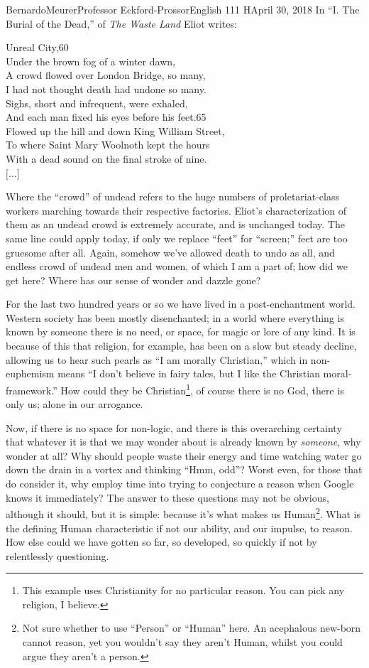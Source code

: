 \documentclass[12pt,letterpaper]{article}
\begin{document}
\begin{mla}{Bernardo}{Meurer}{Professor Eckford-Prossor}{English 111 H}{April 30, 2018}
	In ``I. The Burial of the Dead,'' of \textit{The Waste Land} Eliot writes:
	\begin{blocks}
		Unreal City,\hfill 60\\
		Under the brown fog of a winter dawn,\\
		A crowd flowed over London Bridge, so many,\\
		I had not thought death had undone so many.\\
		Sighs, short and infrequent, were exhaled,\\
		And each man fixed his eyes before his feet.\hfill 65\\
		Flowed up the hill and down King William Street,\\
		To where Saint Mary Woolnoth kept the hours\\
		With a dead sound on the final stroke of nine.\\
		\(\lbrack\ldots\rbrack \)
	\end{blocks}
	Where the ``crowd'' of undead refers to the huge numbers of proletariat-class workers marching towards their respective factories. Eliot's characterization of them as an undead crowd is extremely accurate, and is unchanged today. The same line could apply today, if only we replace ``feet'' for ``screen;'' feet are too gruesome after all. Again, somehow we've allowed death to undo as all, and endless crowd of undead men and women, of which I am a part of; how did we get here? Where has our sense of wonder and dazzle gone?

	For the last two hundred years or so we have lived in a post-enchantment world. Western society has been mostly disenchanted; in a world where everything is known by someone there is no need, or space, for magic or lore of any kind. It is because of this that religion, for example, has been on a slow but steady decline, allowing us to hear such pearls as ``I am morally Christian,'' which in non-euphemism means ``I don't believe in fairy tales, but I like the Christian moral-framework.'' How could they be Christian\footnote{This example uses Christianity for no particular reason. You can pick any religion, I believe.}, of course there is no God, there is only us; alone in our arrogance.

	Now, if there is no space for non-logic, and there is this overarching certainty that whatever it is that we may wonder about is already known by \emph{someone}, why wonder at all? Why should people waste their energy and time watching water go down the drain in a vortex and thinking ``Hmm, odd''? Worst even, for those that do consider it, why employ time into trying to conjecture a reason when Google knows it immediately? The answer to these questions may not be obvious, although it should, but it is simple: because it's what makes us Human\footnote{{Not sure whether to use ``Person'' or ``Human'' here. An acephalous new-born cannot reason, yet you wouldn't say they aren't Human, whilst you could argue they aren't a person.}}. What is the defining Human characteristic if not our ability, and our impulse, to reason. How else could we have gotten so far, so developed, so quickly if not by relentlessly questioning.


\end{mla}
\end{document}
